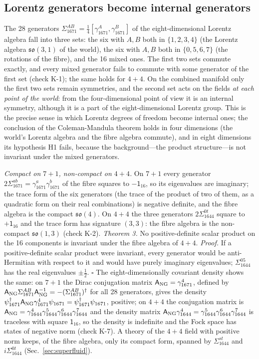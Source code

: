 \subsection{Lorentz generators become internal generators}

The 28 generators $\Sigma^{AB}_{1671}=\tfrac14[\gamma^A_{1671},\gamma^B_{1671}]$ of the eight-dimensional
Lorentz algebra fall into three sets: the six with $A,B$ both in $\{1,2,3,4\}$ (the Lorentz algebra
$\mathfrak{so}(3,1)$ of the world), the six with $A,B$ both in $\{0,5,6,7\}$ (the rotations of the fibre),
and the 16 mixed ones. The first two sets commute exactly, and every mixed generator fails to commute
with some generator of the first set (check K-1); the same holds for $4+4$. On the combined manifold
only the first two sets remain symmetries, and the second set acts on the fields \emph{at each point of
the world}: from the four-dimensional point of view it is an internal symmetry, although it is a
part of the eight-dimensional Lorentz group. This is the precise sense in which Lorentz degrees of
freedom become internal ones; the conclusion of the Coleman-Mandula theorem holds in four
dimensions (the world's Lorentz algebra and the fibre algebra commute), and in eight dimensions its
hypothesis H1 fails, because the background---the product structure---is not invariant under the
mixed generators.

\emph{Compact on $7+1$, non-compact on $4+4$.} On $7+1$ every generator $2\Sigma^{ab}_{1671}=
\gamma^a_{1671}\gamma^b_{1671}$ of the fibre squares to $-\mathsf 1_{16}$, so its eigenvalues are imaginary;
the trace form of the six generators (the trace of the product of two of them, as a quadratic form on their real combinations) is negative definite, and the fibre
algebra is the compact $\mathfrak{so}(4)$. On $4+4$ the three generators $2\Sigma^{0t}_{1644}$ square to
$+\mathsf 1_{16}$ and the trace form has signature $(3,3)$: the fibre algebra is the non-compact
$\mathfrak{so}(1,3)$ (check K-2). \emph{Theorem 3.} No positive-definite scalar product on the 16
components is invariant under the fibre algebra of $4+4$. \emph{Proof.} If a positive-definite scalar
product were invariant, every generator would be anti-Hermitian with respect to it and would have
purely imaginary eigenvalues; $\Sigma^{05}_{1644}$ has the real eigenvalues $\pm\tfrac12$. $\square$
The eight-dimensionally covariant density shows the same: on $7+1$ the Dirac conjugation matrix
$\mathsf A_{\rm NG}=\gamma^4_{1671}$, defined by $\mathsf A_{\rm NG}\Sigma^{AB}_{1671}\mathsf A_{\rm NG}^{-1}=
-(\Sigma^{AB}_{1671})^\dagger$ for all 28 generators, gives the density $\psi^\dagger_{1671}\mathsf A_{\rm NG}
\gamma^4_{1671}\psi_{1671}=\psi^\dagger_{1671}\psi_{1671}$, positive; on $4+4$ the conjugation matrix is
$\mathsf A_{\rm NG}=\gamma^4_{1644}\gamma^5_{1644}\gamma^6_{1644}\gamma^7_{1644}$ and the density matrix
$\mathsf A_{\rm NG}\gamma^4_{1644}=\gamma^5_{1644}\gamma^6_{1644}\gamma^7_{1644}$ is traceless with square
$\mathsf 1_{16}$, so the density is indefinite and the Fock space has states of negative norm (check K-7).
A theory of the $4+4$ field with positive norm keeps, of the fibre algebra, only its compact form,
spanned by $\Sigma^{st}_{1644}$ and $i\Sigma^{0t}_{1644}$ (Sec.~\ref{sec:superfluid}).

